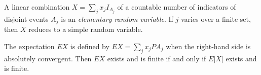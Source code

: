 A linear combination $X = \sum_{j} x_j I_{A_j}$ of a countable number of indicators of disjoint events $A_j$ is an \textit{elementary random variable}. If $j$ varies over a finite set, then $X$ reduces to a simple random variable.

The expectation $EX$ is defined by $EX = \sum_{j} x_j PA_j$ when the right-hand side is absolutely convergent. Then $EX$ exists and is finite if and only if $E|X|$ exists and is finite.
